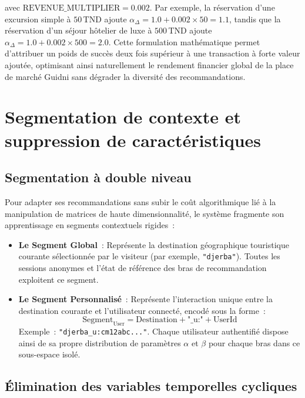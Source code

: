 avec $\text{REVENUE\_MULTIPLIER} = 0.002$. Par exemple, la réservation d'une excursion simple à $50$\,TND ajoute $\alpha_{\Delta} = 1.0 + 0.002 \times 50 = 1.1$, tandis que la réservation d'un séjour hôtelier de luxe à $500$\,TND ajoute $\alpha_{\Delta} = 1.0 + 0.002 \times 500 = 2.0$. Cette formulation mathématique permet d'attribuer un poids de succès deux fois supérieur à une transaction à forte valeur ajoutée, optimisant ainsi naturellement le rendement financier global de la place de marché Guidni sans dégrader la diversité des recommandations.

\section{Segmentation de contexte et suppression de caractéristiques}

\subsection{Segmentation à double niveau}

Pour adapter ses recommandations sans subir le coût algorithmique lié à la manipulation de matrices de haute dimensionnalité, le système fragmente son apprentissage en segments contextuels rigides~:

\begin{itemize}
    \item \textbf{Le Segment Global}~: Représente la destination géographique touristique courante sélectionnée par le visiteur (par exemple, \texttt{"djerba"}). Toutes les sessions anonymes et l'état de référence des bras de recommandation exploitent ce segment.
    \item \textbf{Le Segment Personnalisé}~: Représente l'interaction unique entre la destination courante et l'utilisateur connecté, encodé sous la forme~:
    \begin{equation}
        \text{Segment}_{\text{User}} = \text{Destination} + \text{"\_u:"} + \text{UserId}
        \label{eq:user_segment_key}
    \end{equation}
    Exemple~: \texttt{"djerba\_u:cm12abc..."}. Chaque utilisateur authentifié dispose ainsi de sa propre distribution de paramètres $\alpha$ et $\beta$ pour chaque bras dans ce sous-espace isolé.
\end{itemize}

\subsection{Élimination des variables temporelles cycliques}

